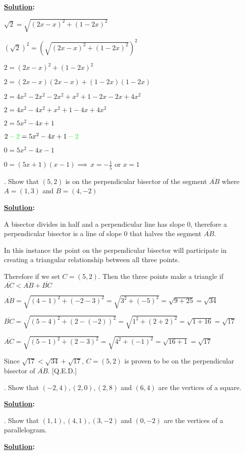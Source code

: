 \documentclass[10pt,letterpaper]{article}
\begin{document}
\smallskip
\textbf{\underline {Solution}:}

$\sqrt{2}=\sqrt{(2x-x)^2+(1-2x)^2}$

$(\sqrt{2})^2=( \sqrt{(2x-x)^2+(1-2x)^2} )^2$

$2=(2x-x)^2+(1-2x)^2$

$2=(2x-x)(2x-x)+(1-2x)(1-2x)$

$2=4x^2-2x^2-2x^2+x^2+1-2x-2x+4x^2$

$2=4x^2-4x^2+x^2+1-4x+4x^2$

$2=5x^2-4x+1$

$2\color{green}-2\color{black}=5x^2-4x+1\color{green}-2\color{black}$

$0=5x^2-4x-1$ 

$0=(5x+1)(x-1) \implies\, x=-\frac{1}{5}$ or $x=1$

. Show that $(5,2)$ is on the perpendicular bisector of the segment $\overline{AB}$ where $A = (1,3)$ and $B=(4, -2)$

\smallskip
\textbf{\underline {Solution}:}

A bisector divides in half and a perpendicular line has slope 0, therefore a perpendicular bisector is a line of slope 0 that halves the segment $\overline{AB}$.

In this instance the point on the perpendicular bisector will participate in creating a triangular relationship between all three points.

Therefore if we set $C=(5,2)$. Then the three points make a triangle if $\overline{AC} <\overline{AB}+\overline{BC}$

$\overline{AB}=\sqrt{(4-1)^2+(-2-3)^2}=\sqrt{3^2+(-5)^2}=\sqrt{9+25}=\sqrt{34}$

$\overline{BC}=\sqrt{(5-4)^2+(2-(-2))^2}=\sqrt{1^2+(2+2)^2}=\sqrt{1+16}=\sqrt{17}$

$\overline{AC}=\sqrt{(5-1)^2+(2-3)^2}=\sqrt{4^2+(-1)^2}=\sqrt{16+1}=\sqrt{17}$

Since $\sqrt{17} < \sqrt{34}+\sqrt{17}$, $C=(5,2)$ is proven to be on the perpendicular bisector of $\overline{AB}$. [Q.E.D.]

. Show that $(-2,4), (2,0), (2,8)$ and $(6,4)$ are the vertices of a square.

\smallskip
\textbf{\color{blue}\underline {Solution}:}

. Show that $(1,1), (4,1), (3,-2)$ and $(0,-2)$ are the vertices of a parallelogram.

\smallskip
\textbf{\color{blue}\underline {Solution}:}
\end{document}
